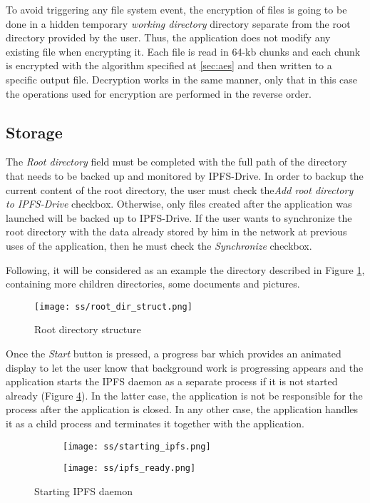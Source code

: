 \documentclass[12pt]{report}
\begin{document}
To avoid triggering any file system event, the encryption of files is going to be done in a hidden temporary \textit{working directory} directory separate from the root directory provided by the user. Thus, the application does not modify any existing file when encrypting it. Each file is read in 64-kb chunks and each chunk is encrypted with the algorithm specified at \ref{sec:aes} and then written to a specific output file. Decryption works in the same manner, only that in this case the operations used for encryption are performed in the reverse order.

\subsection{Storage}

The \textit{Root directory} field must be completed with the full path of the directory that needs to be backed up and  monitored by IPFS-Drive. In order to backup the current content of the root directory, the user must check the\textit{Add root directory to IPFS-Drive} checkbox. Otherwise, only files created after the application was launched will be backed up to IPFS-Drive. If the user wants to synchronize the root directory with the data already stored by him in the network at previous uses of the application, then he must check the \textit{Synchronize} checkbox. 

Following, it will be considered as an example the directory described in Figure \ref {fig:rootdirstruct}, containing more children directories, some documents and pictures.

\begin{figure}[H]
\centerline{\texttt{[image: ss/root\_dir\_struct.png]}}
    \caption{Root directory structure}
    \label{fig:rootdirstruct}
\end{figure}

Once the \textit{Start} button is pressed, a progress bar which provides an animated display to let the user know that background work is progressing appears and the application starts the IPFS daemon as a separate process if it is not started already (Figure \ref{fig:ipfsstart}). In the latter case, the application is not be responsible for the process after the application is closed. In any other case, the application handles it as a child process and terminates it together with the application.     

\begin{figure}[H]
  \begin{subfigure}{0.47\textwidth}
    \texttt{[image: ss/starting\_ipfs.png]}
    \label{fig:startingipfs}
    \caption{}
  \end{subfigure}
  \hfill
  \begin{subfigure}{0.47\textwidth}
    \texttt{[image: ss/ipfs\_ready.png]}
    \label{fig:ipfsstarted}
\caption{}
  \end{subfigure}
\caption{Starting IPFS daemon}
 \label{fig:ipfsstart}
\end{figure}
\end{document}
